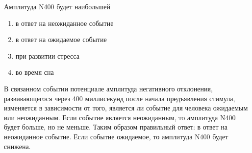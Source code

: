 
Амплитуда N400 будет наибольшей

\begin{enumerate}
    \item в ответ на неожиданное событие
    \item в ответ на ожидаемое событие
    \item при развитии стресса
    \item во время сна
\end{enumerate}

\explanationSection

В связанном событии потенциале амплитуда негативного отклонения, развивающегося через 400 миллисекунд после начала предъявления стимула, изменяется в зависимости от того, является ли событие для человека ожидаемым или неожиданным. Если событие является неожиданным, то амплитуда N400 будет больше, но не меньше. Таким образом правильный ответ: в ответ на неожиданное событие. Если событие ожидаемое, то амплитуда N400 будет снижена.

